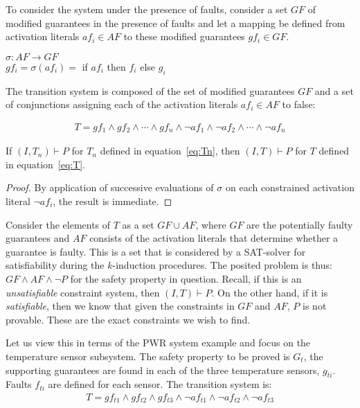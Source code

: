 To consider the system under the presence of faults, consider a set $GF$ of modified guarantees in the presence of faults and let a mapping be defined from activation literals $af_i \in AF$ to these modified guarantees $gf_i \in GF$. 
\begin{center}
$\sigma : AF \rightarrow GF$ \\
$gf_i = \sigma(af_i) =$ if $af_i$ then $f_i$ else $g_i$
\label{eq:sigma}
\end{center}

The transition system is composed of the set of modified guarantees $GF$ and a set of conjunctions assigning each of the activation literals $af_i \in AF$ to false: 

\begin{gather}
T = gf_1 \land gf_2 \land \cdots \land gf_n \land \neg af_1 \land \neg af_2 \land \cdots \land \neg af_n
\label{eq:T}
\end{gather}

\begin{lemma} If $(I,T_n) \vdash P$ for $T_n$ defined in equation~\ref{eq:Tn}, then $(I,T) \vdash P$ for $T$ defined in equation~\ref{eq:T}.
\begin{proof}
By application of successive evaluations of $\sigma$ on each constrained activation literal $\neg af_i$, the result is immediate.
\end{proof}
\end{lemma}

Consider the elements of $T$ as a set $GF \cup AF$, where $GF$ are the potentially faulty guarantees and $AF$ consists of the activation literals that determine whether a guarantee is faulty. This is a set that is considered by a SAT-solver for satisfiability during the $k$-induction procedures. The posited problem is thus: $GF \land AF \land \neg P$ for the safety property in question. Recall, if this is an \emph{unsatisfiable} constraint system, then $(I,T) \vdash P$. On the other hand, if it is \emph{satisfiable}, then we know that given the constraints in $GF$ and $AF$, $P$ is not provable. These are the exact constraints we wish to find. 

Let us view this in terms of the PWR system example and focus on the temperature sensor subsystem. The safety property to be proved is $G_t$, the supporting guarantees are found in each of the three temperature sensors, $g_{ti}$. Faults $f_{ti}$ are defined for each sensor. The transition system is: 
\begin{gather*}
T = gf_{t1} \land gf_{t2} \land gf_{t3}  \land \neg af_{t1} \land \neg af_{t2} \land \neg af_{t3}
\end{gather*}

